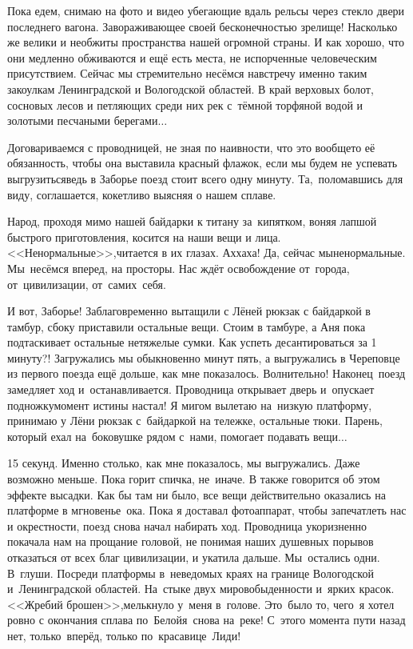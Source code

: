 Пока едем, снимаю на фото и видео убегающие вдаль рельсы через стекло двери последнего вагона. Завораживающее своей бесконечностью зрелище! Насколько же велики и необжиты пространства нашей огромной страны. И как хорошо, что они медленно обживаются и ещё есть места, не испорченные человеческим присутствием. Сейчас мы стремительно несёмся навстречу именно таким закоулкам Ленинградской и Вологодской областей. В край верховых болот, сосновых лесов и петляющих среди них рек с~тёмной торфяной водой и золотыми песчаными берегами$\ldots$

Договариваемся с проводницей, не зная по наивности, что это вообще\sdash то её обязанность, чтобы она выставила красный флажок, если мы будем не успевать выгрузиться\mdash ведь в Заборье поезд стоит всего одну минуту. Та,~поломавшись для виду, соглашается, кокетливо выясняя о нашем сплаве. 

Народ, проходя мимо нашей байдарки к титану за~кипятком, воняя лапшой быстрого приготовления, косится на наши вещи и лица.  <<Ненормальные>>,\mdash читается в их глазах. Ах\sdash ха\sdash ха! Да, сейчас мы\mdash ненормальные. Мы~несёмся вперед, на просторы. Нас ждёт освобождение от~города, от~цивилизации, от~самих~себя.

И вот, Заборье! Заблаговременно вытащили с Лёней рюкзак с байдаркой в тамбур, сбоку приставили остальные вещи. Стоим в тамбуре, а Аня пока подтаскивает остальные нетяжелые сумки. Как успеть десантироваться за 1 минуту?! Загружались мы обыкновенно минут пять, а выгружались в Череповце из первого поезда ещё дольше, как мне показалось. Волнительно! Наконец~поезд замедляет ход и~останавливается. Проводница открывает дверь и~опускает подножку\mdash момент истины настал! Я мигом вылетаю на~низкую платформу, принимаю у Лёни рюкзак с~байдаркой на тележке, остальные тюки. Парень, который ехал на~боковушке рядом с~нами, помогает подавать вещи$\ldots$

15 секунд. Именно столько, как мне показалось, мы выгружались. Даже возможно меньше. Пока горит спичка, не~иначе. В \cite{Квадригин} также говорится об этом эффекте высадки. Как бы там ни было, все вещи действительно оказались на платформе в мгновенье~ока. Пока я доставал фотоаппарат, чтобы запечатлеть нас и окрестности, поезд снова начал набирать ход. Проводница укоризненно покачала нам на прощание головой, не понимая наших душевных порывов отказаться от всех благ цивилизации, и укатила дальше. Мы~остались одни. В~глуши. Посреди платформы в~неведомых краях на границе Вологодской и~Ленинградской областей. На~стыке двух миров\mdash обыденности и~ярких красок. <<Жребий брошен>>,\mdash мелькнуло у~меня в~голове. Это~было то, чего~я хотел ровно с окончания сплава по~Белой\mdash я~снова на~реке! С~этого момента пути назад нет, только~вперёд, только по~красавице~Лиди!

